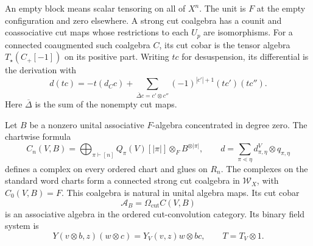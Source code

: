 An empty block means scalar tensoring on all of $X^n$. The unit is $F$
at the empty configuration and zero elsewhere. A strong cut coalgebra
has a counit and coassociative cut maps whose restrictions to each $U_p$
are isomorphisms. For a connected coaugmented such coalgebra $C$, its cut
cobar is the tensor algebra $T_\star(C_+[-1])$ on its positive part.
Writing $tc$ for desuspension, its differential is the derivation with
\[
 d(tc)=-t(d_Cc)+
 \sum_{\overline\Delta c=c'\otimes c''}
             (-1)^{|c'|+1}(tc')(tc'').
\]
Here $\overline\Delta$ is the sum of the nonempty cut maps.

\begin{theorem}\label{v4-arith:asi:all-arity}
Let $B$ be a nonzero unital associative $F$-algebra concentrated in degree
zero. The chartwise formula
\begin{equation}\label{v4-arith:asi:coefficient-complex}
 C_n(V,B)=\bigoplus_{\pi\vdash[n]}Q_\pi(V)[|\pi|]\otimes_F B^{\otimes|\pi|},
 \qquad d=\sum_{\pi\lessdot\eta}d^V_{\pi,\eta}\otimes q_{\pi,\eta}
\end{equation}
defines a complex on every ordered chart and glues on $R_n$.
The complexes on the standard word charts form a connected strong cut
coalgebra in $\mathcal W_X$, with $C_0(V,B)=F$. This coalgebra is
natural in unital algebra maps. Its cut cobar
\[
 \mathcal A_B=\Omega_{\mathrm{cut}}C(V,B)
\]
is an associative algebra in the ordered cut-convolution category.
Its binary field system is
\begin{equation}\label{v4-arith:asi:singular-fields}
 Y(v\otimes b,z)(w\otimes c)=Y_V(v,z)w\otimes bc,
 \qquad T=T_V\otimes1.
\end{equation}
\end{theorem}

